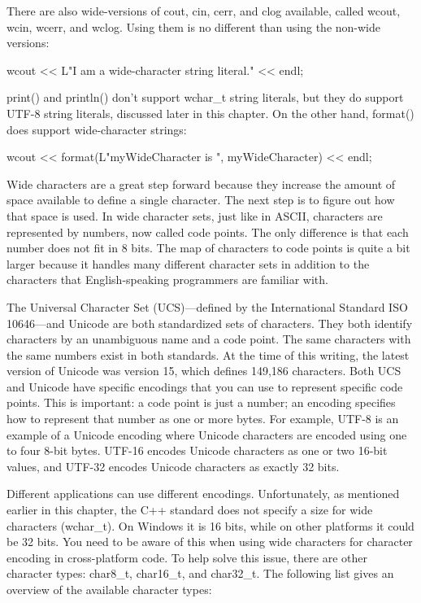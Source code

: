 There are also wide-versions of cout, cin, cerr, and clog available, called wcout, wcin, wcerr, and wclog. Using them is no different than using the non-wide versions:


\begin{cpp}
wcout << L"I am a wide-character string literal." << endl;
\end{cpp}

print() and println() don’t support wchar\_t string literals, but they do support UTF-8 string literals, discussed later in this chapter. On the other hand, format() does support wide-character strings:

\begin{cpp}
wcout << format(L"myWideCharacter is {}", myWideCharacter) << endl;
\end{cpp}


Wide characters are a great step forward because they increase the amount of space available to define a single character. The next step is to figure out how that space is used. In wide character sets, just like in ASCII, characters are represented by numbers, now called code points. The only difference is that each number does not fit in 8 bits. The map of characters to code points is quite a bit larger because it handles many different character sets in addition to the characters that English-speaking programmers are familiar with.

The Universal Character Set (UCS)—defined by the International Standard ISO 10646—and Unicode are both standardized sets of characters. They both identify characters by an unambiguous name and a code point. The same characters with the same numbers exist in both standards. At the time of this writing, the latest version of Unicode was version 15, which defines 149,186 characters. Both UCS and Unicode have specific encodings that you can use to represent specific code points. This is important: a code point is just a number; an encoding specifies how to represent that number as one or more bytes. For example, UTF-8 is an example of a Unicode encoding where Unicode characters are encoded using one to four 8-bit bytes. UTF-16 encodes Unicode characters as one or two 16-bit values, and UTF-32 encodes Unicode characters as exactly 32 bits.

Different applications can use different encodings. Unfortunately, as mentioned earlier in this chapter, the C++ standard does not specify a size for wide characters (wchar\_t). On Windows it is 16 bits, while on other platforms it could be 32 bits. You need to be aware of this when using wide characters for character encoding in cross-platform code. To help solve this issue, there are other character types: char8\_t, char16\_t, and char32\_t. The following list gives an overview of the available character types:

